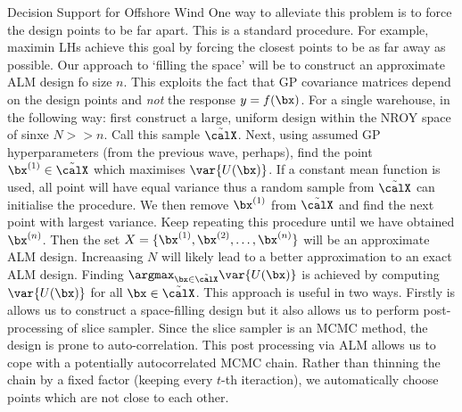 \begin{chapter}{Decision Support for Offshore Wind \label{Ch:ds-for-ow}}
One way to alleviate this problem is to force the design points to be far apart. This is a standard procedure. For example, maximin LHs achieve this goal by forcing the closest points to be as far away as possible. Our approach to `filling the space' will be to construct an approximate ALM design fo size $n$. This exploits the fact that GP covariance matrices depend on the design points and \textit{not} the response $y = f(\bx)$. For a single warehouse, in the following way: first construct a large, uniform design within the NROY space of sinxe $N>>n$. Call this sample $\tilde{\calX}$. Next, using assumed GP hyperparameters (from the previous wave, perhaps), find the point $\bx^{(1)} \in \tilde{\calX}$ which maximises $\var\{ U(\bx) \}$. If a constant mean function is used, all point will have equal variance thus a random sample from $\tilde{\calX}$ can initialise the procedure. We then remove $\bx^{(1)}$ from $\tilde{\calX}$ and find the next point with largest variance. Keep repeating this procedure until we have obtained $\bx^{(n)}$. Then the set $X = \{\bx^{(1)}, \bx^{(2)}, \ldots, \bx^{(n)}\}$ will be an approximate ALM design. Increaasing $N$ will likely lead to a better approximation to an exact ALM design. Finding $\argmax_{\bx \in \tilde{\calX}} \var \{ U(\bx) \}$ is achieved by computing $\var \{ U(\bx) \}$ for all $\bx \in \tilde{\calX}$. This approach is useful in two ways. Firstly is allows us to construct a space-filling design but it also allows us to perform post-processing of slice sampler. Since the slice sampler is an MCMC method, the design is prone to auto-correlation.  This post processing via ALM allows us to cope with a potentially autocorrelated MCMC chain. Rather than thinning the chain by a fixed factor (keeping every $t$-th iteraction), we automatically choose points which are not close to each other.


\end{chapter}
